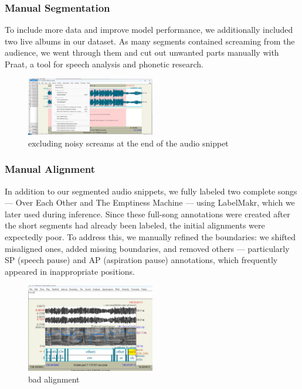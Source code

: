 \documentclass[a4paper]{article}
\begin{document}
\subsubsection*{Manual Segmentation}
To include more data and improve model performance, we additionally included two live albums in our dataset. As many segments contained screaming from the audience, we went through them and cut out unwanted parts manually with Praat, a tool for speech analysis and phonetic research.


\begin{figure}[htbp]
    \centering
    \includegraphics[width=0.5\textwidth]{graphics/cutting_noise.png}
    \caption{excluding noisy screams at the end of the audio snippet}
    \label{fig:bild1}
\end{figure}


\subsubsection*{Manual Alignment}
In addition to our segmented audio snippets, we fully labeled two complete songs — Over Each Other and The Emptiness Machine — using LabelMakr, which we later used during inference. Since these full-song annotations were created after the short segments had already been labeled, the initial alignments were expectedly poor. To address this, we manually refined the boundaries: we shifted misaligned ones, added missing boundaries, and removed others — particularly SP (speech pause) and AP (aspiration pause) annotations, which frequently appeared in inappropriate positions.

\begin{figure}[htbp]
    \centering
    \includegraphics[width=0.5\textwidth]{graphics/bad_alignment.png}
    \caption{bad alignment}
    \label{fig:bild2}
\end{figure}
\end{document}
